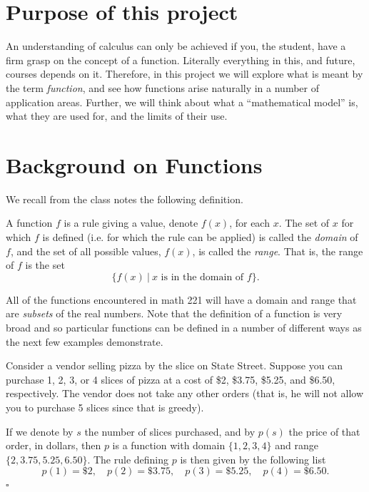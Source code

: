 
\section{Purpose of this project}

An understanding of calculus can only be achieved if you, the student,
have a firm grasp on the concept of a function.  Literally everything
in this, and future, courses depends on it.  Therefore, in this
project we will explore what is meant by the term \textit{function},
and see how functions arise naturally in a number of application
areas.  Further, we will think about what a ``mathematical model'' is,
what they are used for, and the limits of their use.


\section{Background on Functions}
We recall from the class notes the following definition.

\begin{definition}
  A function $f$ is a rule giving a value, denote $f(x)$, for each
  $x$.  The set of $x$ for which $f$ is defined (i.e. for which the
  rule can be applied) is called the \emph{domain} of $f$, and the
  set of all possible values, $f(x)$, is called the \emph{range}.
  That is, the range of $f$ is the set
  \[
  \{f(x) \ | \ x \text{ is in the domain of $f$}\}.
  \]
\end{definition}

\bigskip

All of the functions encountered in math 221 will have a domain and
range that are \textit{subsets} of the real numbers.  Note that the
definition of a function is very broad and so particular functions can
be defined in a number of different ways as the next few examples
demonstrate.

\begin{example}
  Consider a vendor selling pizza by the slice on State Street.
  Suppose you can purchase 1, 2, 3, or 4 slices of pizza at a cost
  of \$2, \$3.75, \$5.25, and \$6.50, respectively.  The vendor
  does not take any other orders (that is, he will not allow you
  to purchase 5 slices since that is greedy).

  If we denote by $s$ the number of slices purchased, and by
  $p(s)$ the price of that order, in dollars, then $p$ is a
  function with domain $\{1, 2, 3, 4\}$ and range $\{2, 3.75,
  5.25, 6.50\}$.  The rule defining $p$ is then given by the
  following list
  \[
  p(1) = \$2, \quad p(2) = \$ 3.75,\quad p(3) = \$5.25, \quad p(4)
  = \$6.50.
  \]\hfill $\square$
\end{example}

